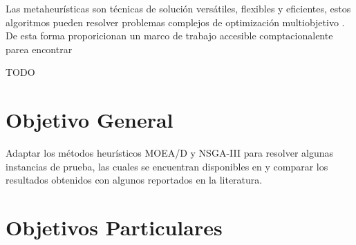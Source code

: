 \documentclass[letterpaper,10pt]{article}
\begin{document}
%
Las metaheurísticas son técnicas de solución versátiles, flexibles y eficientes, estos algoritmos pueden resolver problemas complejos de optimización multiobjetivo \cite{coello1999comprehensive}.
\newline
De esta forma proporicionan un marco de trabajo accesible comptacionalente parea encontrar 

{\huge TODO}

%
%      

\section{Objetivo General}

Adaptar los métodos heurísticos MOEA/D y NSGA-III para resolver algunas instancias de prueba, las cuales se encuentran disponibles en \cite{zhang2008multiobjective} y comparar los resultados obtenidos con algunos reportados en la literatura.

\section{Objetivos Particulares}
\end{document}
